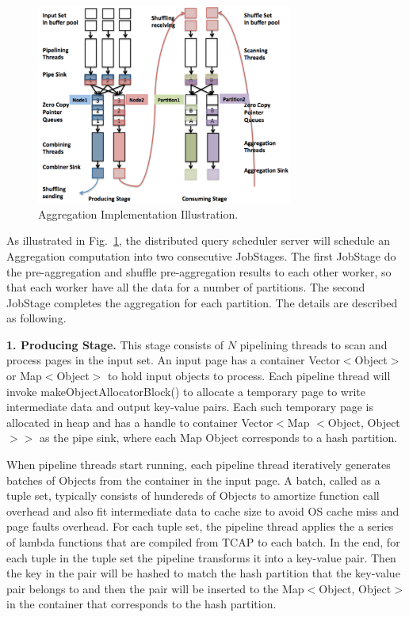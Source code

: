 \begin{figure}
\centering
\includegraphics[width=0.75\textwidth]{aggregation.pdf}
  \caption{\label{fig:aggregation} Aggregation Implementation Illustration.}
\end{figure}

As illustrated in Fig.~\ref{fig:aggregation}, the distributed query scheduler server will schedule an Aggregation computation into two consecutive JobStages. The first JobStage do the pre-aggregation and shuffle pre-aggregation results to each other worker, so that each worker have all the data for a number of partitions. The second JobStage completes the aggregation for each partition. The details are described as following.

\vspace{5pt}
{\bf 1. Producing Stage.} This stage consists of $N$ pipelining threads to scan and process pages in the input set. An input page has a container Vector$<$Object$>$ or Map$<$Object$>$ to hold input objects to process. Each pipeline thread will invoke makeObjectAllocatorBlock() to allocate a temporary page to write intermediate data and output key-value pairs. Each such temporary page is allocated in heap and has a handle to container Vector$<$Map $<$Object, Object$>$$>$ as the pipe sink, where each Map Object corresponds to a hash partition. 

When pipeline threads start running, each pipeline thread iteratively generates batches of Objects from the container in the input page. A batch, called as a tuple set, typically consists of hundereds of Objects to amortize function call overhead and also fit intermediate data to cache size to avoid OS cache miss and page faults overhead. For each tuple set, the pipeline thread applies the a series of lambda functions that are compiled from TCAP to each batch. In the end, for each tuple in the tuple set the pipeline transforms it into a key-value pair. Then the key in the pair will be hashed to match the hash partition that the key-value pair belongs to and then the pair will be inserted to the Map$<$Object, Object$>$ in the container that corresponds to the hash partition.

